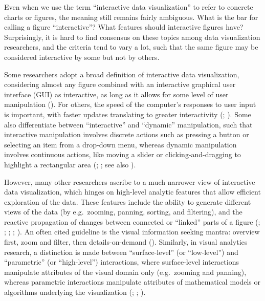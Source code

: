 \documentclass[
]{book}
\begin{document}
Even when we use the term ``interactive data visualization'' to refer to concrete charts or figures, the meaning still remains fairly ambiguous. What is the bar for calling a figure ``interactive''? What features should interactive figures have? Surprisingly, it is hard to find consensus on these topics among data visualization researchers, and the criteria tend to vary a lot, such that the same figure may be considered interactive by some but not by others.

Some researchers adopt a broad definition of interactive data visualization, considering almost any figure combined with an interactive graphical user interface (GUI) as interactive, as long as it allows for some level of user manipulation (). For others, the speed of the computer's responses to user input is important, with faster updates translating to greater interactivity (; ). Some also differentiate between ``interactive'' and ``dynamic'' manipulation, such that interactive manipulation involves discrete actions such as pressing a button or selecting an item from a drop-down menu, whereas dynamic manipulation involves continuous actions, like moving a slider or clicking-and-dragging to highlight a rectangular area (; ; see also ).

However, many other researchers ascribe to a much narrower view of interactive data visualization, which hinges on high-level analytic features that allow efficient exploration of the data. These features include the ability to generate different views of the data (by e.g.~zooming, panning, sorting, and filtering), and the reactive propagation of changes between connected or ``linked'' parts of a figure (; ; ; ; ). An often cited guideline is the visual information seeking mantra: overview first, zoom and filter, then details-on-demand (). Similarly, in visual analytics research, a distinction is made between ``surface-level'' (or ``low-level'') and ``parametric'' (or ``high-level'') interactions, where surface-level interactions manipulate attributes of the visual domain only (e.g.~zooming and panning), whereas parametric interactions manipulate attributes of mathematical models or algorithms underlying the visualization (; ; ).
\end{document}
